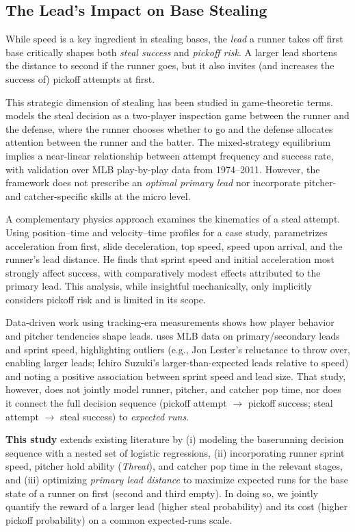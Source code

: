 \documentclass[12pt,letterpaper]{article}
\begin{document}
\subsection{The Lead's Impact on Base Stealing}

While speed is a key ingredient in stealing bases, the \emph{lead} a runner takes off first base critically shapes both \emph{steal success} and \emph{pickoff risk}. A larger lead shortens the distance to second if the runner goes, but it also invites (and increases the success of) pickoff attempts at first.

This strategic dimension of stealing has been studied in game-theoretic terms. \cite{Turocy2014Theft} models the steal decision as a two-player inspection game between the runner and the defense, where the runner chooses whether to go and the defense allocates attention between the runner and the batter. The mixed-strategy equilibrium implies a near-linear relationship between attempt frequency and success rate, with validation over MLB play-by-play data from 1974--2011. However, the framework does not prescribe an \emph{optimal primary lead} nor incorporate pitcher- and catcher-specific skills at the micro level.

A complementary physics approach examines the kinematics of a steal attempt. Using position–time and velocity–time profiles for a case study, \cite{Kagan2013StolenBasePhysics} parametrizes acceleration from first, slide deceleration, top speed, speed upon arrival, and the runner's lead distance. He finds that sprint speed and initial acceleration most strongly affect success, with comparatively modest effects attributed to the primary lead. This analysis, while insightful mechanically, only implicitly considers pickoff risk and is limited in its scope.

Data-driven work using tracking-era measurements shows how player behavior and pitcher tendencies shape leads. \cite{Lindbergh2015Statcast} uses MLB data on primary/secondary leads and sprint speed, highlighting outliers (e.g., Jon Lester's reluctance to throw over, enabling larger leads; Ichiro Suzuki's larger-than-expected leads relative to speed) and noting a positive association between sprint speed and lead size. That study, however, does not jointly model runner, pitcher, and catcher pop time, nor does it connect the full decision sequence (pickoff attempt $\to$ pickoff success; steal attempt $\to$ steal success) to \emph{expected runs}.

\textbf{This study} extends existing literature by (i) modeling the baserunning decision sequence with a nested set of logistic regressions, (ii) incorporating runner sprint speed, pitcher hold ability (\emph{Threat}), and catcher pop time in the relevant stages, and (iii) optimizing \emph{primary lead distance} to maximize expected runs for the base state of a runner on first (second and third empty). In doing so, we jointly quantify the reward of a larger lead (higher steal probability) and its cost (higher pickoff probability) on a common expected-runs scale.
\end{document}

